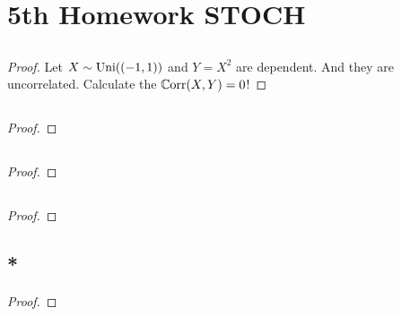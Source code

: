 
\section{5th Homework STOCH}
\subsection{}
\begin{proof}
	Let $X \sim \operatorname{Uni}((-1,1))$ and $Y = X^2$ are dependent. And they are uncorrelated.
	Calculate the $\mathbb{C}\text{orr}(X,Y) = 0$!
\end{proof}

\subsection{}
\begin{proof}}
	
\end{proof}
\subsection{}
\begin{proof}
	
\end{proof}
\subsection{}
\begin{proof}
	
\end{proof}

\subsection{}
\begin{proof}
	
\end{proof}

\subsection{*}
\begin{proof}
	
\end{proof}